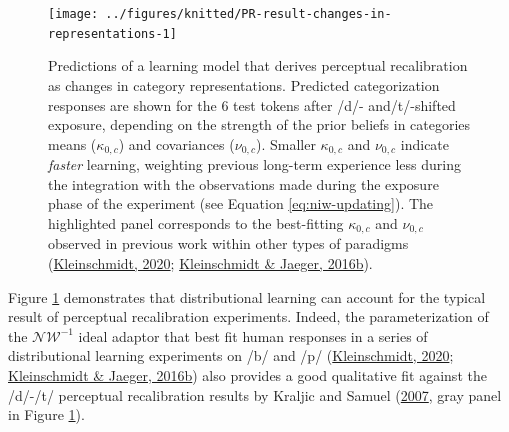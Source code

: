 \documentclass[
  11pt,
  english,
  man,floatsintext]{apa6}
\begin{document}
\begin{figure}

{\centering \texttt{[image: ../figures/knitted/PR-result-changes-in-representations-1]} 

}

\caption{Predictions of a learning model that derives perceptual recalibration as changes in category representations. Predicted categorization responses are shown for the 6 test tokens after /d/- and/t/-shifted exposure, depending on the strength of the prior beliefs in categories means (\(\kappa_{0,c}\)) and covariances (\(\nu_{0,c}\)). Smaller \(\kappa_{0,c}\) and \(\nu_{0,c}\) indicate \emph{faster} learning, weighting previous long-term experience less during the integration with the observations made during the exposure phase of the experiment (see Equation \eqref{eq:niw-updating}). The highlighted panel corresponds to the best-fitting \(\kappa_{0,c}\) and \(\nu_{0,c}\) observed in previous work within other types of paradigms (\protect\hyperlink{ref-kleinschmidt2020}{Kleinschmidt, 2020}; \protect\hyperlink{ref-kleinschmidt-jaeger2016cogsci}{Kleinschmidt \& Jaeger, 2016b}).}\label{fig:PR-result-changes-in-representations}
\end{figure}

Figure \ref{fig:PR-result-changes-in-representations} demonstrates that distributional learning can account for the typical result of perceptual recalibration experiments. Indeed, the parameterization of the \(\mathcal{NW}^{-1}\) ideal adaptor that best fit human responses in a series of distributional learning experiments on /b/ and /p/ (\protect\hyperlink{ref-kleinschmidt2020}{Kleinschmidt, 2020}; \protect\hyperlink{ref-kleinschmidt-jaeger2016cogsci}{Kleinschmidt \& Jaeger, 2016b}) also provides a good qualitative fit against the /d/-/t/ perceptual recalibration results by Kraljic and Samuel (\protect\hyperlink{ref-kraljic-samuel2007}{2007}, gray panel in Figure \ref{fig:PR-result-changes-in-representations}).
\end{document}
